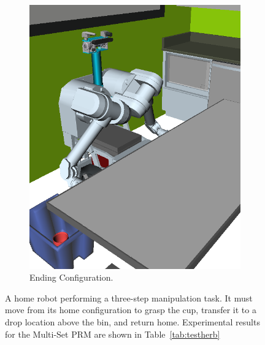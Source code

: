 \begin{figure}
\begin{widepage}
\begin{subfigure}[t]{0.185\linewidth}
\includegraphics[width=\columnwidth]{figs/testherb-e.png}
\caption{Ending Configuration.}
\end{subfigure}

\caption{
  A home robot performing a three-step manipulation task.
  It must move from its home configuration
  to grasp the cup,
  transfer it to a drop location above the bin,
  and return home.
  Experimental results for the Multi-Set PRM
  are shown in Table~\ref{tab:testherb}}
\label{fig:testherb-problem}
\end{widepage}
\end{figure}

